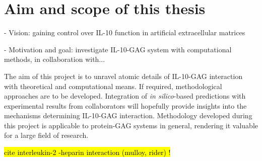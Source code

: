 \lipsum[1-5]




\section{Aim and scope of this thesis}

- Vision: gaining control over IL-10 function in artificial extracellular matrices

- Motivation and goal: investigate IL-10-GAG system with computational
      methods, in collaboration with...

The aim of this project is to unravel atomic details of IL-10-GAG interaction
with theoretical and computational means. If required, methodological approaches
are to be developed. Integration of \textit{in silico}-based predictions with
experimental results from collaborators will hopefully provide insights into the
mechanisms determining IL-10-GAG interaction. Methodology developed during this
project is applicable to protein-GAG systems in general, rendering it valuable
for a large field of research.



\hl{cite interleukin-2 -heparin interaction (mulloy, rider) !}

\lipsum[1-5]





